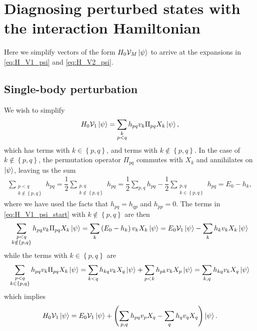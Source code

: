 \documentclass[nofootinbib,notitlepage,11pt]{revtex4-2}
\newcommand{\f}[2]{\dfrac{#1}{#2}} %
\newcommand{\p}[1]{\left(#1\right)} %
\renewcommand{\set}[1]{\left\{#1\right\}} %
\newcommand{\1}{\mathds{1}}
\newcommand{\V}{\mathcal{V}}
\begin{document}
\appendix

\section{Diagnosing perturbed states with the interaction Hamiltonian}

Here we simplify vectors of the form $H_0\V_M\ket\psi$ to arrive at
the expansions in \eqref{eq:H_V1_psi} and \eqref{eq:H_V2_psi}.

\subsection{Single-body perturbation}
\label{sec:H_V1_psi}

We wish to simplify
\begin{align}
  H_0 \V_1 \ket\psi
  = \sum_{\substack{k\\p<q}} h_{pq} v_k \Pi_{pq} X_k \ket\psi,
  \label{eq:H_V1_psi_start}
\end{align}
which has terms with $k\in\set{p,q}$, and terms with
$k\notin\set{p,q}$.  In the case of $k\notin\set{p,q}$, the
permutation operator $\Pi_{pq}$ commutes with $X_k$ and annihilates on
$\ket\psi$, leaving us the sum
\begin{align}
  \sum_{\substack{p<q\\k\notin\set{p,q}}} h_{pq}
  = \f12 \sum_{\substack{p,q\\k\notin\set{p,q}}} h_{pq}
  = \f12 \sum_{p,q} h_{pq}
  - \f12 \sum_{\substack{p,q\\k\in\set{p,q}}} h_{pq}
  = E_0 - h_k,
\end{align}
where we have used the facts that $h_{pq}=h_{qp}$ and $h_{pp}=0$.  The
terms in \eqref{eq:H_V1_psi_start} with $k\notin\set{p,q}$ are then
\begin{align}
  \sum_{\substack{p<q\\k\notin\set{p,q}}}
  h_{pq} v_k \Pi_{pq} X_k \ket\psi
  = \sum_k \p{E_0 - h_k} v_k X_k \ket\psi
  = E_0 \V_1 \ket\psi - \sum_k h_k v_k X_k \ket\psi
\end{align}
while the terms with $k\in\set{p,q}$ are
\begin{align}
  \sum_{\substack{p<q\\k\in\set{p,q}}}
  h_{pq} v_k \Pi_{pq} X_k \ket\psi
  = \sum_{k<q} h_{kq} v_k X_q \ket\psi
  + \sum_{p<k} h_{pk} v_k X_p \ket\psi
  = \sum_{k,q} h_{kq} v_k X_q \ket\psi
\end{align}
which implies
\begin{align}
  H_0 \V_1 \ket\psi
  = E_0 \V_1 \ket\psi
  + \p{\sum_{p,q} h_{pq} v_p X_q - \sum_q h_q v_q X_q} \ket\psi.
\end{align}
\end{document}
